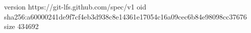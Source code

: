 version https://git-lfs.github.com/spec/v1
oid sha256:a60000241de9f7cf4eb3d938c8e14361e17054c16a09cec6b84e98098cc37676
size 434692
